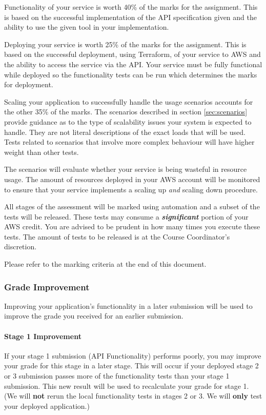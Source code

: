 \documentclass{csse4400}
\begin{document}
Functionality of your service is worth 40\% of the marks for the assignment. This is based on the successful implementation of the API specification given and the ability to use the given tool in your implementation.

Deploying your service is worth 25\% of the marks for the assignment. This is based on the successful deployment, using Terraform, of your service to AWS and the ability to access the service via the API. Your service must be fully functional while deployed so the functionality tests can be run which determines the marks for deployment.

Scaling your application to successfully handle the usage scenarios accounts for the other 35\% of the marks. The scenarios described in section \ref{sec:scenarios} provide guidance as to the type of scalability issues your system is expected to handle. They are not literal descriptions of the exact loads that will be used. Tests related to scenarios that involve more complex behaviour will have higher weight than other tests.

The scenarios will evaluate whether your service is being wasteful in resource usage. The amount of resources deployed in your AWS account will be monitored to ensure that your service implements a scaling up \emph{and} scaling down procedure.

All stages of the assessment will be marked using automation and a subset of the tests will be released. These tests may consume a \textbf{\emph{significant}} portion of your AWS credit. You are advised to be prudent in how many times you execute these tests. The amount of tests to be released is at the Course Coordinator's discretion.

Please refer to the marking criteria at the end of this document.

\subsubsection{Grade Improvement}\label{sec:improve}
Improving your application's functionality in a later submission will be used to improve the grade you received for an earlier submission.

\paragraph{Stage 1 Improvement}
If your stage 1 submission (API Functionality) performs poorly, you may improve your grade for this stage in a later stage.
This will occur if your deployed stage 2 or 3 submission passes more of the functionality tests than your stage 1 submission.
This new result will be used to recalculate your grade for stage 1.
(We will \textbf{not} rerun the local functionality tests in stages 2 or 3. We will \textbf{only} test your deployed application.)
\end{document}
